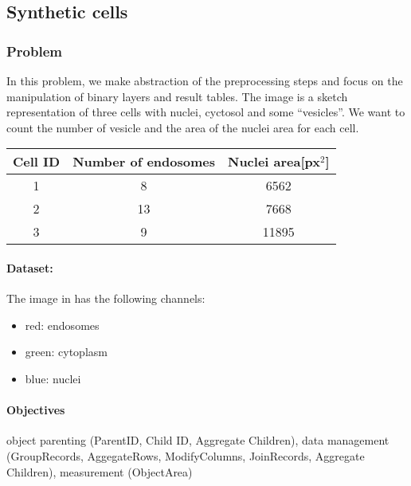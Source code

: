 \subsection{Synthetic cells}

\subsubsection*{Problem}
In this problem, we make abstraction of the preprocessing steps and focus on the manipulation of binary layers and result tables. The image is a sketch representation of three cells with nuclei, cyctosol and some  ``vesicles''. We want to count the number of vesicle and the area of the nuclei area for each cell.

\begin{center}
\begin{tabular}{ccc}
    Cell ID& Number of endosomes& Nuclei area[px$^2$]\\\hline
    1&8&6562\\
    2&13&7668\\
    3&9&11895\\
\end{tabular}   
\end{center}

\paragraph{Dataset:} The image in  has the following channels:
\begin{itemize}\setlength\itemsep{0em}
    \item red: endosomes
    \item green: cytoplasm
    \item blue: nuclei
\end{itemize}

\paragraph{Objectives} object parenting (ParentID, Child ID, Aggregate Children), data management (GroupRecords, AggegateRows, ModifyColumns, JoinRecords, Aggregate Children), measurement (ObjectArea)


